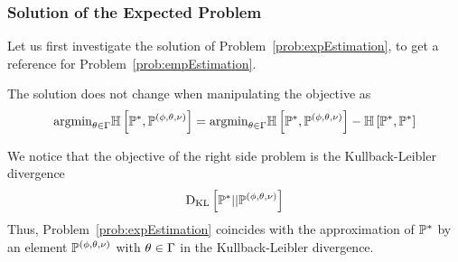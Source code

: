 %


\subsubsection{Solution of the Expected Problem}

Let us first investigate the solution of Problem~\ref{prob:expEstimation}, to get a reference for Problem~\ref{prob:empEstimation}.

%

The solution does not change when manipulating the objective as
\begin{align}
		\mathrm{argmin}_{\theta\in\Gamma} \mathbb{H}\left[\mathbb{P}^*,\mathbb{P}^{(\phi,\theta,\nu)}\right]
		= \mathrm{argmin}_{\theta\in\Gamma} \mathbb{H}\left[\mathbb{P}^*,\mathbb{P}^{(\phi,\theta,\nu)}\right] -  \mathbb{H}\left[\mathbb{P}^*,\mathbb{P}^*\right]
\end{align}

We notice that the objective of the right side problem is the Kullback-Leibler divergence
	\begin{align}
		 \mathrm{D}_{\mathrm{KL}}\left[ \mathbb{P}^* || \mathbb{P}^{(\phi,\theta,\nu)} \right]
	\end{align}
Thus, Problem~\ref{prob:expEstimation} coincides with the approximation of $\mathbb{P}^*$ by an element $\mathbb{P}^{(\phi,\theta,\nu)}$ with $\theta\in\Gamma$ in the Kullback-Leibler divergence.

